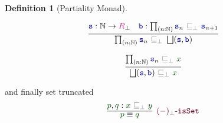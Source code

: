 \documentclass[twoside,11pt,openright]{report}
\theoremstyle{plain} %
\theoremstyle{definition}
\newtheorem{defn}{Definition}[section]
\theoremstyle{remark}
\newcommand*{\term}[1]{\textcolor{green!30!black}{#1}} %
\newcommand*{\type}[1]{\textcolor{magenta!90!black}{#1}}
\newcommand*{\relation}[1]{\textcolor{gray}{\ensuremath{\mathtt{#1}}}}
\newcommand*{\function}[1]{\textcolor{blue!60!black}{\ensuremath{\mathtt{#1}}}}
\newcommand*{\constructor}[1]{\textcolor{purple!60!black}{\ensuremath{\mathtt{#1}}}}
\begin{document}
\begin{defn}[Partiality Monad]
\begin{center}
\begin{minipage}{0.50\linewidth}
      \begin{equation}
        \infer{\prod_{(n : \mathbb{N})} \function{s}_n~\relation{\sqsubseteq_{\bot}}~\bigsqcup(\function{s},\function{b})}{\function{s} : \mathbb{N} \rightarrow \type{R}_\bot & \function{b} : \prod_{(n : \mathbb{N})} \function{s}_n~\relation{\sqsubseteq_{\bot}}~\function{s}_{n+1} }
      \end{equation}
    \end{minipage}
    \hfill
    \begin{minipage}{0.3\linewidth}
      \begin{equation}
        \infer{\bigsqcup(\function{s},\function{b})~\relation{\sqsubseteq_{\bot}}~\term{x}}{\prod_{(n:\mathbb{N})} \function{s}_n~\relation{\sqsubseteq_{\bot}}~\term{x}}
      \end{equation}
    \end{minipage}
  \end{center}
  and finally set truncated
  \begin{equation}
    \infer[\constructor{(-)_\bot\text{-}isSet}]{\term{p} \equiv \term{q}}{\term{p} , \term{q} : \term{x}~\relation{\sqsubseteq_{\bot}}~\term{y}}
  \end{equation}
\end{defn}
\end{document}
